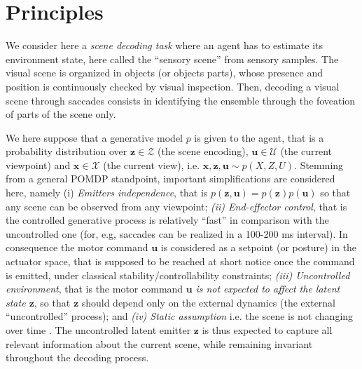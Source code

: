 \documentclass{article}
\begin{document}
 \section{Principles}
We consider here a \emph{scene decoding task} where an agent has to estimate its environment state, here called the ``sensory scene'' from sensory samples. The visual scene is organized in objects (or objects parts), whose presence and position is continuously checked by visual inspection. 
Then, decoding a visual scene through saccades consists in identifying the ensemble through the foveation of parts of the scene only. 

We here suppose that a generative model $p$ is given to the agent, that is a probability distribution over $\boldsymbol{z} \in \mathcal{Z}$ (the scene encoding),  $\boldsymbol{u} \in \mathcal{U}$ (the current viewpoint) and $\boldsymbol{x} \in \mathcal{X}$ (the current view), i.e. $\boldsymbol{x}, \boldsymbol{z}, \boldsymbol{u} \sim p(X,Z,U)$.
Stemming from a general POMDP standpoint, important simplifications are considered here, namely (i) \emph{Emitters independence}, that is $p(\boldsymbol{z}, \boldsymbol{u}) = p(\boldsymbol{z})p(\boldsymbol{u})$ so that
any scene can be observed from any viewpoint; 
\emph{(ii) End-effector control}, 
that is the controlled generative process is relatively ``fast'' in comparison with the uncontrolled one
(for, e.g, saccades can be realized in a 100-200 ms interval). 
In consequence the motor command  $\boldsymbol{u}$ is considered as a setpoint (or posture) in the actuator space, that is supposed to be reached 
at short notice once the command is emitted, under classical stability/controllability constraints; \emph{(iii) Uncontrolled environment}, that is the motor command $\boldsymbol{u}$ \emph{is not expected to affect the  latent state $\boldsymbol{z}$},
so that $\boldsymbol{z}$ should depend only on the external dynamics (the external ``uncontrolled'' process); and
\emph{(iv) Static assumption}
i.e. the scene is not changing over time \cite{butko2010infomax}. 
The uncontrolled latent emitter $\boldsymbol{z}$ is thus expected to capture all relevant information about the current scene, while remaining invariant throughout the decoding process.
\end{document}
